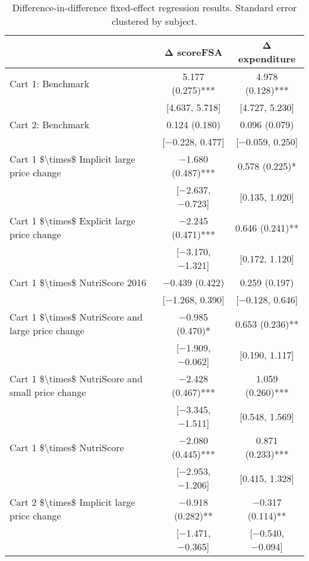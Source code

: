 \begin{table}

\caption{Difference-in-difference fixed-effect regression results. Standard error clustered by subject.}
\centering
\begin{tabular}[t]{lcc}
\toprule
  & Δ scoreFSA & Δ expenditure\\
\midrule
Cart 1: Benchmark & \num{5.177} (\num{0.275})*** & \num{4.978} (\num{0.128})***\\
 & {}[\num{4.637}, \num{5.718}] & {}[\num{4.727}, \num{5.230}]\\
Cart 2: Benchmark & \num{0.124} (\num{0.180}) & \num{0.096} (\num{0.079})\\
 & {}[\num{-0.228}, \num{0.477}] & {}[\num{-0.059}, \num{0.250}]\\
Cart 1 \$\textbackslash{}times\$ Implicit large price change & \num{-1.680} (\num{0.487})*** & \num{0.578} (\num{0.225})*\\
 & {}[\num{-2.637}, \num{-0.723}] & {}[\num{0.135}, \num{1.020}]\\
Cart 1 \$\textbackslash{}times\$ Explicit large price change & \num{-2.245} (\num{0.471})*** & \num{0.646} (\num{0.241})**\\
 & {}[\num{-3.170}, \num{-1.321}] & {}[\num{0.172}, \num{1.120}]\\
Cart 1 \$\textbackslash{}times\$ NutriScore 2016 & \num{-0.439} (\num{0.422}) & \num{0.259} (\num{0.197})\\
 & {}[\num{-1.268}, \num{0.390}] & {}[\num{-0.128}, \num{0.646}]\\
Cart 1 \$\textbackslash{}times\$ NutriScore and large price change & \num{-0.985} (\num{0.470})* & \num{0.653} (\num{0.236})**\\
 & {}[\num{-1.909}, \num{-0.062}] & {}[\num{0.190}, \num{1.117}]\\
Cart 1 \$\textbackslash{}times\$ NutriScore and small price change & \num{-2.428} (\num{0.467})*** & \num{1.059} (\num{0.260})***\\
 & {}[\num{-3.345}, \num{-1.511}] & {}[\num{0.548}, \num{1.569}]\\
Cart 1 \$\textbackslash{}times\$ NutriScore & \num{-2.080} (\num{0.445})*** & \num{0.871} (\num{0.233})***\\
 & {}[\num{-2.953}, \num{-1.206}] & {}[\num{0.415}, \num{1.328}]\\
Cart 2 \$\textbackslash{}times\$ Implicit large price change & \num{-0.918} (\num{0.282})** & \num{-0.317} (\num{0.114})**\\
 & {}[\num{-1.471}, \num{-0.365}] & {}[\num{-0.540}, \num{-0.094}]\\

\end{tabular}
\end{table}
